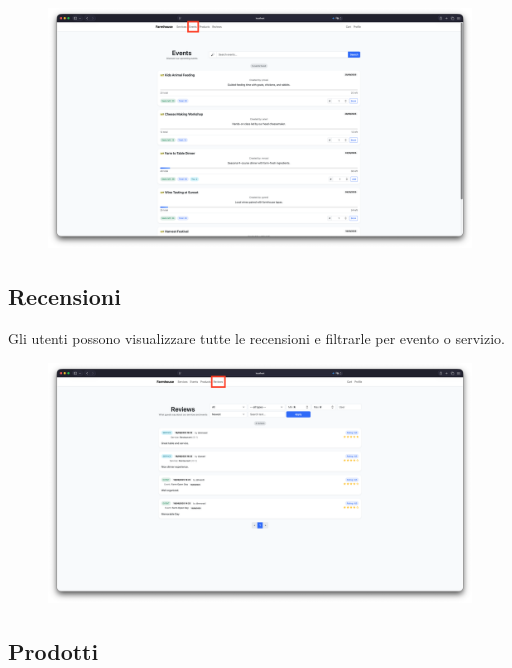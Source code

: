 \documentclass[a4paper,12pt]{report}
\begin{document}
\begin{figure}[H]
    \centering
    \includegraphics[width=\textwidth, trim=0 0 0 0]{./img/users/events.png}
    \vspace{-1em}
    \label{fig:events}
\end{figure}

\subsection*{Recensioni}
Gli utenti possono visualizzare tutte le recensioni e filtrarle per evento o servizio.

\begin{figure}[H]
    \centering
    \includegraphics[width=\textwidth, trim=0 0 0 0]{./img/users/reviews.png}
    \vspace{-1em}
    \label{fig:reviews}
\end{figure}

\subsection*{Prodotti}
\end{document}
